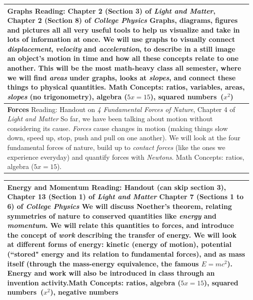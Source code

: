 \documentclass[12pt]{article}
\begin{document}
\begin{tabularx}{\textwidth}[c]{| X |}
	\textbf{Graphs} \newline Reading: Chapter 2 (Section 3) of \textit{Light and Matter}, Chapter 2 (Section 8) of \textit{College Physics} \newline Graphs, diagrams, figures and pictures all all very useful tools to help us visualize and take in lots of information at once. We will use graphs to visually connect \textit{displacement}, \textit{velocity} and \textit{acceleration}, to describe in a still image an object's motion in time and how all these concepts relate to one another. This will be the most math-heavy class all semester, where we will find \textit{areas} under graphs, looks at \textit{slopes}, and connect these things to physical quantities. \newline Math Concepts: ratios, variables, areas, \textit{slopes} (no trigonometry), algebra ($5x=15$), squared numbers~($x^2$)\\ \hline
	\textbf{Forces} \newline Reading: Handout on \textit{4 Fundamental Forces of Nature}, Chapter 4 of \textit{Light and Matter} \newline So far, we have been talking about motion without considering its cause. \textit{Forces} cause changes in motion (making things slow down, speed up, stop, push and pull on one another). We will look at the four fundamental forces of nature, build up to \textit{contact forces} (like the ones we experience everyday) and quantify forces with \textit{Newtons}. \newline Math Concepts: ratios, algebra ($5x=15$).\\ \hline
\end{tabularx}

\noindent \begin{tabularx}{\textwidth}[c]{| X |}
\hline
	\textbf{Energy and Momentum} \newline Reading: Handout (can skip section 3), Chapter 13 (Section 1) of \textit{Light and Matter} Chapter 7 (Sections 1 to 6) of \textit{College Physics} \newline We will discuss Noether's theorem, relating symmetries of nature to conserved quantities like \textit{energy} and \textit{momentum}. We will relate this quantities to forces, and introduce the concept of \textit{work} describing the transfer of energy. We will look at different forms of energy: kinetic (energy of motion), potential (``stored" energy and its relation to fundamental forces), and as mass itself (through the mass-energy equivalence, the famous $E=mc^2$). Energy and work will also be introduced in class through an invention activity.\newline Math Concepts: ratios, algebra ($5x = 15$), squared numbers~($x^2$), negative numbers\\ \hline
	\end{tabularx}
\vspace{0.1in}
\end{document}
